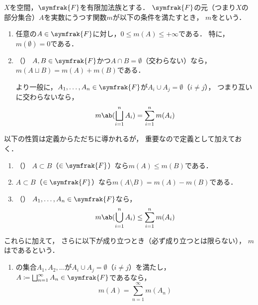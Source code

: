 \documentclass[../sotsu.tex]{subfiles}
\begin{document}
\begin{definition}
    \label{dfn:content-measure}
    $X$を空間，$\symfrak{F}$を有限加法族とする．
    $\symfrak{F}$の元（つまり$X$の部分集合）$A$を実数にうつす関数$m$が以下の条件を満たすとき，
    $m$をという．
    \begin{enumerate}
        \item \label{content-measure:positivity}
            任意の$A \in \symfrak{F}$に対し，$0 \leq m(A) \leq +\infty$である．
            特に，$m(\emptyset) = 0$である．
        \item \label{content-measure:additivity}（）
            $A, B \in \symfrak{F}$かつ$A \cap B = \emptyset$（交わらない）なら，
            $m(A \sqcup B) = m(A) + m(B)$である．

            より一般に，$A_1, \dots, A_n \in \symfrak{F}$が$A_i \cup A_j = \emptyset$（$i \neq j$），
            つまり互いに交わらないなら，
            \begin{equation*}
                m \ab( \bigsqcup_{i=1}^{n} A_i ) = \sum_{i=1}^{n} m(A_i)
            \end{equation*}
    \end{enumerate}
    以下の性質は定義からただちに導かれるが，
    重要なので定義として加えておく．
    \begin{enumerate}[resume]
        \item \label{content-measure:monotonicity}（）
            $A \subset B$（$\in \symfrak{F}$）なら$m(A) \leq m(B)$である．
        \item $A \subset B$（$\in \symfrak{F}$）なら$m(A \setminus B) = m(A) - m(B)$である．
        \item \label{content-measure:subadditivity}（）
            $A_1, \dots, A_n \in \symfrak{F}$なら，
            \begin{equation*}
                m \ab( \bigcup_{i=1}^{n} A_i ) \leq \sum_{i=1}^{n} m(A_i)
            \end{equation*}
    \end{enumerate}
    これらに加えて，
    さらに以下が成り立つとき（必ず成り立つとは限らない），
    $m$はであるという．
    \begin{enumerate}[resume]
        \item {}の集合$A_1, A_2, \dotsc$が$A_i \cup A_j = \emptyset$（$i \neq j$）を満たし，
            $A \coloneq \bigsqcup_{n=1}^{\infty} A_n \in \symfrak{F}$であるなら，
            \begin{equation*}
                m(A) = \sum_{n=1}^{\infty} m(A_n)
            \end{equation*}
    \end{enumerate}
\end{definition}
\end{document}
